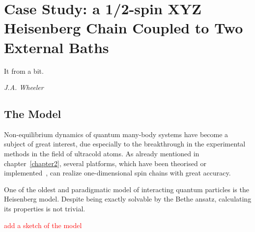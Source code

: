 \chapter{Case Study: a 1/2-spin XYZ Heisenberg Chain Coupled to Two External Baths}
\label{Chapter3}
\epigraph{It from a bit.}{\textit{J.A. Wheeler}}

\section{The Model}
\label{sec:model}
Non-equilibrium dynamics of quantum many-body systems have become a subject of great interest, due especially to the breakthrough in the experimental methods in the field of ultracold atoms. As already mentioned in chapter~\ref{chapter2}, several platforms, which have been theorised or implemented~\cite{exp_spinChain}, can realize one-dimensional spin chains with great accuracy. 

One of the oldest and paradigmatic model of interacting quantum particles is the Heisenberg model. Despite being exactly solvable by the Bethe ansatz, calculating its properties is not trivial. 

\textcolor{red}{add a sketch of the model}

